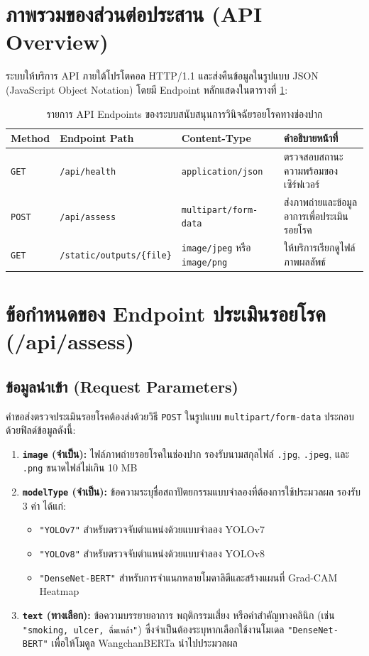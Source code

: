 \section{ภาพรวมของส่วนต่อประสาน (API Overview)}
ระบบให้บริการ API ภายใต้โปรโตคอล HTTP/1.1 และส่งคืนข้อมูลในรูปแบบ JSON (JavaScript Object Notation) โดยมี Endpoint หลักแสดงในตารางที่ \ref{tab:api_endpoints}:

\begin{table}[htbp]
\centering
\small
\caption{รายการ API Endpoints ของระบบสนับสนุนการวินิจฉัยรอยโรคทางช่องปาก}
\label{tab:api_endpoints}
\begin{tabular}{p{1.8cm}p{4.2cm}p{3.5cm}p{4.2cm}}
\toprule
\textbf{Method} & \textbf{Endpoint Path} & \textbf{Content-Type} & \textbf{คำอธิบายหน้าที่} \\
\midrule
\texttt{GET} & \texttt{/api/health} & \texttt{application/json} & ตรวจสอบสถานะความพร้อมของเซิร์ฟเวอร์ \\
\texttt{POST} & \texttt{/api/assess} & \texttt{multipart/form-data} & ส่งภาพถ่ายและข้อมูลอาการเพื่อประเมินรอยโรค \\
\texttt{GET} & \texttt{/static/outputs/\{file\}} & \texttt{image/jpeg} หรือ \texttt{image/png} & ให้บริการเรียกดูไฟล์ภาพผลลัพธ์ \\
\bottomrule
\end{tabular}
\end{table}

\section{ข้อกำหนดของ Endpoint ประเมินรอยโรค (/api/assess)}

\subsection{ข้อมูลนำเข้า (Request Parameters)}
คำขอส่งตรวจประเมินรอยโรคต้องส่งด้วยวิธี \texttt{POST} ในรูปแบบ \texttt{multipart/form-data} ประกอบด้วยฟิลด์ข้อมูลดังนี้:

\begin{enumerate}
    \item \textbf{\texttt{image} (จำเป็น):} ไฟล์ภาพถ่ายรอยโรคในช่องปาก รองรับนามสกุลไฟล์ \texttt{.jpg}, \texttt{.jpeg}, และ \texttt{.png} ขนาดไฟล์ไม่เกิน 10 MB
    \item \textbf{\texttt{modelType} (จำเป็น):} ข้อความระบุชื่อสถาปัตยกรรมแบบจำลองที่ต้องการใช้ประมวลผล รองรับ 3 ค่า ได้แก่:
    \begin{itemize}
        \item \texttt{"YOLOv7"} สำหรับตรวจจับตำแหน่งด้วยแบบจำลอง YOLOv7
        \item \texttt{"YOLOv8"} สำหรับตรวจจับตำแหน่งด้วยแบบจำลอง YOLOv8
        \item \texttt{"DenseNet-BERT"} สำหรับการจำแนกหลายโมดาลิตีและสร้างแผนที่ Grad-CAM Heatmap
    \end{itemize}
    \item \textbf{\texttt{text} (ทางเลือก):} ข้อความบรรยายอาการ พฤติกรรมเสี่ยง หรือคำสำคัญทางคลินิก (เช่น \texttt{"smoking, ulcer, ดื่มเหล้า"}) ซึ่งจำเป็นต้องระบุหากเลือกใช้งานโมเดล \texttt{"DenseNet-BERT"} เพื่อให้โมดูล WangchanBERTa นำไปประมวลผล
\end{enumerate}


